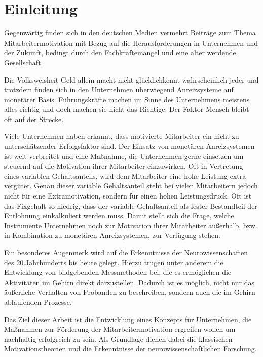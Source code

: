 \section{Einleitung}

Gegenwärtig finden sich in den deutschen Medien vermehrt Beiträge zum Thema Mitarbeitermotivation mit Bezug auf die Herausforderungen in Unternehmen und der Zukunft, bedingt durch den Fachkräftemangel und eine älter werdende Gesellschaft. \citep{Zeit.03.04.2014}

Die Volksweisheit \glqq Geld allein macht nicht glücklich\grqq kennt wahrscheinlich jeder und trotzdem finden sich in den Unternehmen überwiegend Anreizsysteme auf monetärer Basis. Führungskräfte machen im Sinne des Unternehmens meistens alles richtig und doch machen sie nicht das Richtige. Der Faktor Mensch bleibt oft auf der Strecke. \citep[S. 16]{Seelbach.2011}

Viele Unternehmen haben erkannt, dass motivierte Mitarbeiter ein nicht zu unterschätzender Erfolgsfaktor sind. Der Einsatz von monetären Anreizsystemen ist weit verbreitet und eine Maßnahme, die Unternehmen gerne einsetzen um steuernd auf die Motivation ihrer Mitarbeiter einzuwirken. Oft in Vertretung eines variablen Gehaltsanteils, wird dem Mitarbeiter eine hohe Leistung extra vergütet. Genau dieser variable Gehaltsanteil steht bei vielen Mitarbeitern jedoch nicht für  eine Extramotivation, sondern für einen hohen Leistungsdruck. Oft ist das Fixgehalt so niedrig, dass der variable Gehaltsanteil als fester Bestandteil der Entlohnung einkalkuliert werden muss. Damit stellt sich die Frage, welche Instrumente Unternehmen noch zur Motivation ihrer Mitarbeiter außerhalb, bzw. in Kombination zu monetären Anreizsystemen, zur Verfügung stehen. \citep{Nowka.2013}

Ein besonderes Augenmerk wird auf die Erkenntnisse der Neurowissenschaften des  20.Jahrhunderts bis heute gelegt. Hierzu trugen unter anderem die Entwicklung von bildgebenden Messmethoden bei, die es ermöglichen die Aktivitäten im Gehirn direkt darzustellen. Dadurch ist es möglich, nicht nur das äußerliche Verhalten von Probanden zu beschreiben, sondern auch die im Gehirn ablaufenden Prozesse. 

Das Ziel dieser Arbeit ist die Entwicklung eines Konzepts für Unternehmen, die Maßnahmen zur Förderung der Mitarbeitermotivation ergreifen wollen um nachhaltig erfolgreich zu sein. Als Grundlage dienen dabei die klassischen Motivationstheorien und die Erkenntnisse der neurowissenschaftlichen Forschung.

\newpage